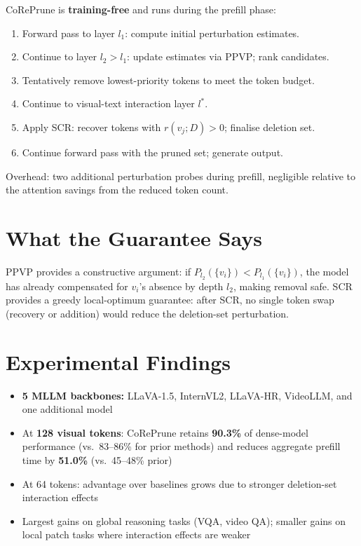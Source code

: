 \documentclass[10pt,twocolumn]{article}
\begin{document}
CoRePrune is \textbf{training-free} and runs during the prefill phase:
\begin{enumerate}[itemsep=2pt,parsep=0pt]
  \item Forward pass to layer $l_1$: compute initial perturbation estimates.
  \item Continue to layer $l_2 > l_1$: update estimates via PPVP; rank candidates.
  \item Tentatively remove lowest-priority tokens to meet the token budget.
  \item Continue to visual-text interaction layer $l^*$.
  \item Apply SCR: recover tokens with $r(v_j; D) > 0$; finalise deletion set.
  \item Continue forward pass with the pruned set; generate output.
\end{enumerate}

Overhead: two additional perturbation probes during prefill, negligible relative
to the attention savings from the reduced token count.

\section{What the Guarantee Says}

PPVP provides a constructive argument: if $P_{l_2}(\{v_i\}) < P_{l_1}(\{v_i\})$,
the model has already compensated for $v_i$'s absence by depth $l_2$, making
removal safe. SCR provides a greedy local-optimum guarantee: after SCR, no
single token swap (recovery or addition) would reduce the deletion-set perturbation.

\section{Experimental Findings}

\begin{itemize}[itemsep=2pt,parsep=0pt]
  \item \textbf{5 MLLM backbones:} LLaVA-1.5, InternVL2, LLaVA-HR,
    VideoLLM, and one additional model
  \item At \textbf{128 visual tokens}: CoRePrune retains \textbf{90.3\%}
    of dense-model performance (vs.\ 83--86\% for prior methods) and reduces
    aggregate prefill time by \textbf{51.0\%} (vs.\ 45--48\% prior)
  \item At 64 tokens: advantage over baselines grows due to stronger
    deletion-set interaction effects
  \item Largest gains on global reasoning tasks (VQA, video QA); smaller
    gains on local patch tasks where interaction effects are weaker
\end{itemize}
\end{document}
